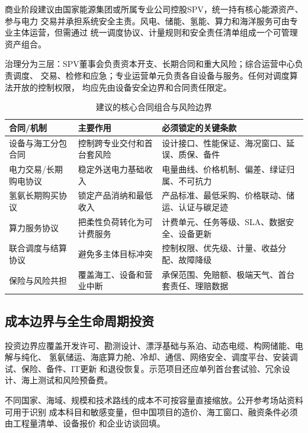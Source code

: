 商业阶段建议由国家能源集团或所属专业公司控股SPV，统一持有核心能源资产、参与电力
交易并承担系统安全主责。风电、储能、氢能、算力和海洋服务可由专业主体运营，但需通过
统一调度协议、计量规则和安全责任清单组成一个可管理资产组合。

治理分为三层：SPV董事会负责资本开支、长期合同和重大风险；综合运营中心负责调度、
交易、检修和应急；专业运营单元负责各自设备与服务。任何对调度算法开放的控制权限，
均应先由设备安全边界和合同责任限定。

\begin{table}[H]
\centering
\caption{建议的核心合同组合与风险边界}
\label{tab:c6-contracts}
\small
\begin{tabularx}{\textwidth}{p{2.8cm} X X}
\toprule
合同/机制 & 主要作用 & 必须锁定的关键条款\\
\midrule
设备与海工分包合同 & 控制跨专业交付和首台套风险 & 设计接口、性能保证、海况窗口、延误、质保、备件\\
电力交易/长期购电协议 & 稳定外送电力基础收入 & 电量曲线、价格机制、偏差、绿证归属、不可抗力\\
氢氨长期购买协议 & 锁定产品消纳和最低收入 & 产品标准、最低采购、价格联动、储运、认证与碳足迹\\
算力服务协议 & 把柔性负荷转化为可计费服务 & 计费单元、任务等级、SLA、数据安全、设备更新\\
联合调度与结算协议 & 避免多主体目标冲突 & 控制权限、优先级、计量、收益分配、故障降级\\
保险与风险共担 & 覆盖海工、设备和营业中断 & 承保范围、免赔额、极端天气、首台套责任、理赔数据\\
\bottomrule
\end{tabularx}
\end{table}

\subsection{成本边界与全生命周期投资}

投资边界应覆盖开发许可、勘测设计、漂浮基础与系泊、动态电缆、构网储能、电解与纯化、
氢氨储运、海底算力舱、冷却、通信、网络安全、调度平台、安装调试、保险、备件、IT更新
和退役恢复。示范项目还应单列首台套试验、冗余设计、海上测试和风险预备费。

不同国家、海域、规模和技术路线的成本不可按容量直接缩放。公开参考场站资料可用于识别
成本科目和敏感变量，但中国项目的造价、海工窗口、融资条件必须由工程量清单、设备报价
和企业访谈回填\cite{nrel-cost-review}。

